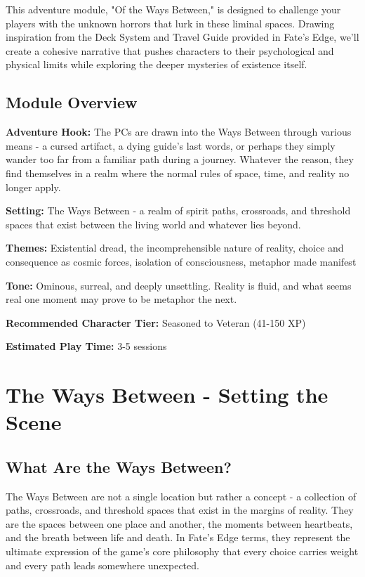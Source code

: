 \documentclass[11pt]{article}
\begin{document}
This adventure module, "Of the Ways Between," is designed to challenge your players with the unknown horrors that lurk in these liminal spaces. Drawing inspiration from the Deck System and Travel Guide provided in Fate's Edge, we'll create a cohesive narrative that pushes characters to their psychological and physical limits while exploring the deeper mysteries of existence itself.

\subsection{Module Overview}

\textbf{Adventure Hook:} The PCs are drawn into the Ways Between through various means - a cursed artifact, a dying guide's last words, or perhaps they simply wander too far from a familiar path during a journey. Whatever the reason, they find themselves in a realm where the normal rules of space, time, and reality no longer apply.

\textbf{Setting:} The Ways Between - a realm of spirit paths, crossroads, and threshold spaces that exist between the living world and whatever lies beyond.

\textbf{Themes:} Existential dread, the incomprehensible nature of reality, choice and consequence as cosmic forces, isolation of consciousness, metaphor made manifest

\textbf{Tone:} Ominous, surreal, and deeply unsettling. Reality is fluid, and what seems real one moment may prove to be metaphor the next.

\textbf{Recommended Character Tier:} Seasoned to Veteran (41-150 XP)

\textbf{Estimated Play Time:} 3-5 sessions

\section{The Ways Between - Setting the Scene}

\subsection{What Are the Ways Between?}

The Ways Between are not a single location but rather a concept - a collection of paths, crossroads, and threshold spaces that exist in the margins of reality. They are the spaces between one place and another, the moments between heartbeats, and the breath between life and death. In Fate's Edge terms, they represent the ultimate expression of the game's core philosophy that every choice carries weight and every path leads somewhere unexpected.
\end{document}
